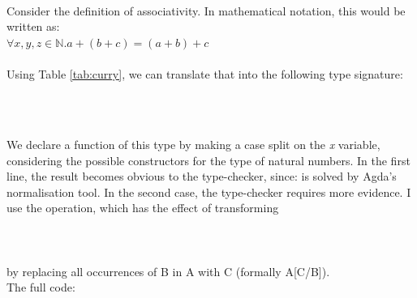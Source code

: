 \documentclass[12pt,twoside,notitlepage]{report}
\begin{document}
\begin{code}%
\>  \AgdaSymbol{:}  \<%
\\
\>[0]\<[2]%
\>[2] \AgdaSymbol{:} \<%
\\
\>[0]\<[2]%
\>[2] \<[7]%
\>[7]\AgdaSymbol{:}   \<%
\end{code}\\

\noindent Consider the definition of associativity. In mathematical notation, this would be written as:\\

\indent $\forall x, y, z \in \mathbb{N}. a + (b + c) = (a + b) + c$ \\
\\
Using Table \ref{tab:curry}, we can translate that into the following type signature: 

\begin{code}
\\
\>[0]\<[2]%
\>[2] \AgdaSymbol{:} \AgdaSymbol{(}   \AgdaSymbol{:} \AgdaSymbol{)}  \AgdaSymbol{(} \AgdaPrimitive{+} \AgdaSymbol{(} \AgdaPrimitive{+} \AgdaSymbol{))}  \AgdaSymbol{((} \AgdaPrimitive{+} \AgdaSymbol{)} \AgdaPrimitive{+} \AgdaSymbol{)}\<%
\\
\end{code}

\noindent We declare a function of this type by making a case split on the \textit{x} variable, considering the possible constructors for the type of natural numbers. In the first line, the result becomes obvious to the type-checker, since: 
\AgdaSymbol{(}  \AgdaPrimitive{+} \AgdaSymbol{(} \AgdaPrimitive{+} \AgdaSymbol{))} \AgdaDatatype{=}   \AgdaPrimitive{+}  \AgdaDatatype{=}\AgdaSymbol{((} \AgdaPrimitive{+} \AgdaSymbol{)} \AgdaPrimitive{+} \AgdaSymbol{)} is solved by  Agda's normalisation tool.
In the second case, the type-checker requires more evidence. I use the  operation, which has the effect of transforming\\\\
\indent {}     \\\\
by replacing all occurrences of B in A with C (formally A[C/B]). \\ 
The full code: \\
\end{document}
